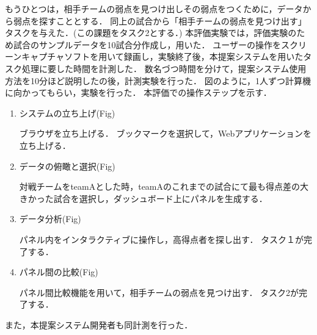\documentclass[sotsuron]{kuee}
\begin{document}
					もうひとつは，相手チームの弱点を見つけ出しその弱点をつくために，データから弱点を探すこととする．
					同上の試合から「相手チームの弱点を見つけ出す」タスクを与えた．(この課題をタスク2とする．)
					本評価実験では，評価実験のため試合のサンプルデータを10試合分作成し，用いた．
					ユーザーの操作をスクリーンキャプチャソフトを用いて録画し，実験終了後，本提案システムを用いたタスク処理に要した時間を計測した．
					数名づつ時間を分けて，提案システム使用方法を10分ほど説明したの後，計測実験を行った．
					図のように，1人ずつ計算機に向かってもらい，実験を行った．
					本評価での操作ステップを示す．
					\begin{enumerate}
						\item システムの立ち上げ(Fig)
						
						ブラウザを立ち上げる．
						ブックマークを選択して，Webアプリケーションを立ち上げる．
						\item データの俯瞰と選択(Fig)
						
						対戦チームをteamAとした時，teamAのこれまでの試合にて最も得点差の大きかった試合を選択し，ダッシュボード上にパネルを生成する．
						\item データ分析(Fig)
						
						パネル内をインタラクティブに操作し，高得点者を探し出す．
						タスク１が完了する．
						\item パネル間の比較(Fig)
						
						パネル間比較機能を用いて，相手チームの弱点を見つけ出す．
						タスク2が完了する．
					\end{enumerate}
					また，本提案システム開発者も同計測を行った．
\end{document}
